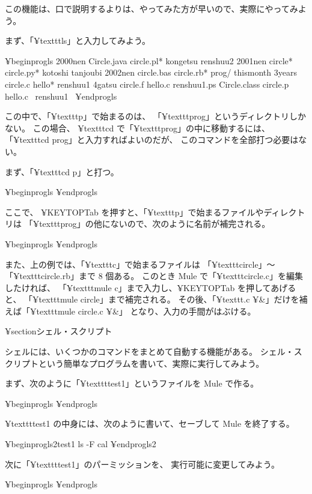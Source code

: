 この機能は、口で説明するよりは、やってみた方が早いので、実際にやってみよう。

まず、「¥texttt{ls}」と入力してみよう。

¥begin{progls}
2000nen         Circle.java     circle.pl*      kongetsu        renshuu2
2001nen         circle*         circle.py*      kotoshi         tanjoubi
2002nen         circle.bas      circle.rb*      prog/           thismonth
3years          circle.c        hello*          renshuu1
4gatsu          circle.f        hello.c         renshuu1.ps
Circle.class    circle.p        hello.c~        renshuu1~
%
¥end{progls}

この中で、「¥texttt{p}」で始まるのは、
「¥texttt{prog}」というディレクトリしかない。
この場合、 ¥texttt{cd} で「¥texttt{prog}」の中に移動するには、
「¥texttt{cd prog}」と入力すればよいのだが、
このコマンドを全部打つ必要はない。

まず、「¥texttt{cd p}」と打つ。

¥begin{progls}
¥end{progls}

ここで、 ¥KEYTOP{Tab} を押すと、「¥texttt{p}」で始まるファイルやディレクトリは
「¥texttt{prog}」の他にないので、次のように名前が補完される。

¥begin{progls}
¥end{progls}

また、上の例では、「¥texttt{c}」で始まるファイルは 
「¥texttt{circle}」〜「¥texttt{circle.rb}」まで 8 個ある。
このとき Mule で「¥texttt{circle.c}」を編集したければ、
「¥texttt{mule c}」まで入力し、¥KEYTOP{Tab} を押してあげると、
「¥texttt{mule circle}」まで補完される。
その後、「¥texttt{.c ¥&}」だけを補えば「¥texttt{mule circle.c ¥&}」
となり、入力の手間がはぶける。

¥section{シェル・スクリプト}

シェルには、いくつかのコマンドをまとめて自動する機能がある。
シェル・スクリプトという簡単なプログラムを書いて、実際に実行してみよう。

まず、次のように「¥texttt{test1}」というファイルを Mule で作る。

¥begin{progls}
%
¥end{progls}

¥texttt{test1} の中身には、次のように書いて、セーブして Mule を終了する。

¥begin{progls2}{test1}
ls -F
cal
¥end{progls2}

次に「¥texttt{test1}」のパーミッションを、
実行可能に変更してみよう。

¥begin{progls}
%
¥end{progls}

